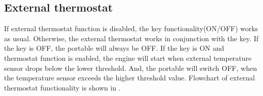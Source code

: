 \clearpage
\subsection{External thermostat}
\label{ch:extthermostat}
If external thermostat function is disabled, the key functionality(ON/OFF) works as usual. Otherwise, the external thermostat works in conjunction with the key. If the key is OFF, the portable will always be OFF.
If the key is ON and thermostat function is enabled, the engine will start when external temperature sensor drops below the lower threshold.
And, the portable will switch OFF, when the temperature sensor exceeds the higher threshold value. Flowchart of external thermostat functionality is shown in .

\begin{figure}[h]		
	
	\vspace*{3.8in}
	\label{fig:ExternalThermostatSequence}	
\end{figure}


